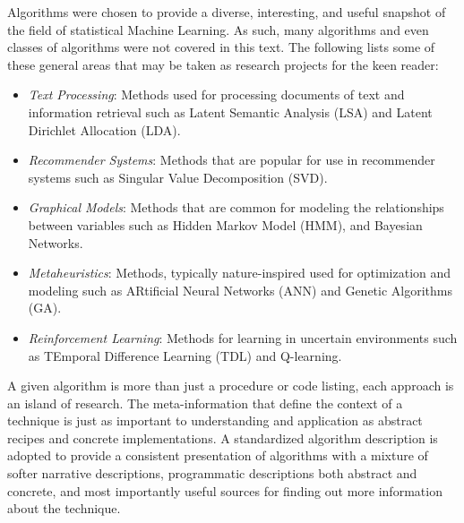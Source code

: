 Algorithms were chosen to provide a diverse, interesting, and useful snapshot of the field of statistical Machine  Learning. As such, many algorithms and even classes of algorithms were not covered in this text. The following lists some of these general areas that may be taken as research projects for the keen reader:

\begin{itemize}
	\item \emph{Text Processing}: Methods used for processing documents of text and information retrieval such as Latent Semantic Analysis (LSA) and Latent Dirichlet Allocation (LDA).
	\item \emph{Recommender Systems}: Methods that are popular for use in recommender systems such as Singular Value Decomposition (SVD).
	\item \emph{Graphical Models}: Methods that are common for modeling the relationships between variables such as Hidden Markov Model (HMM), and Bayesian Networks.
	\item \emph{Metaheuristics}: Methods, typically nature-inspired used for optimization and modeling such as ARtificial Neural Networks (ANN) and Genetic Algorithms (GA).
	\item \emph{Reinforcement Learning}: Methods for learning in uncertain environments such as TEmporal Difference Learning (TDL) and Q-learning.
\end{itemize}

A given algorithm is more than just a procedure or code listing, each approach is an island of research. The meta-information that define the context of a technique is just as important to understanding and application as abstract recipes and concrete implementations. A standardized algorithm description is adopted to provide a consistent presentation of algorithms with a mixture of softer narrative descriptions, programmatic descriptions both abstract and concrete, and most importantly useful sources for finding out more information about the technique.

